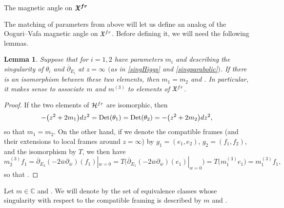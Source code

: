 \documentclass[11pt]{article}
\numberwithin{equation}{section}
\newtheorem{Lemma}[Theorem]{Lemma}
\numberwithin{equation}{section}
\begin{document}
\begin{subsubsection}{The magnetic angle on $\boldsymbol{\mathfrak{X}^{{\rm fr}}}$}

The matching of parameters from above will let us define an analog of the Ooguri--Vafa magnetic angle on $\mathfrak{X}^{{\rm fr}}$. Before defining it, we will need the following lemmas.

\begin{Lemma}\label{mm3inv} Suppose that  for $i=1,2$ have parameters $m_i$ and  describing the singularity of $\theta_i$ and $\overline{\partial}_{E_i}$ at $z=\infty$ $($as in \eqref{singHiggs} and \eqref{singparabolic}$)$. If there is an isomorphism between these two elements, then $m_1=m_2$ and . In particular, it makes sense to associate $m$ and $m^{(3)}$ to elements of $\mathfrak{X}^{\textnormal{fr}}$.

\end{Lemma}

\begin{proof} If the two elements of $\mathcal{H}^{{\rm fr}}$ are isomorphic, then
\begin{equation*}
-\bigl(z^2+2m_1\bigr){\rm d}z^2=\operatorname{Det}(\theta_1)=\operatorname{Det}(\theta_2)=-\bigl(z^2+2m_2\bigr){\rm d}z^2,
\end{equation*}
so that $m_1=m_2$. On the other hand, if we denote the compatible frames (and their extensions to local frames around $z=\infty$) by $g_1=(e_1,e_2)$, $g_2=(f_1,f_2)$, and the isomorphism by $T$, we then have
\begin{equation*}
 m^{(3)}_2f_1=\overline{\partial}_{E_2}(-2\overline{w}\partial_{\overline{w}})(f_1)|_{w=0}=T\bigl(\overline{\partial}_{E_1}(-2\overline{w}\partial_{\overline{w}})(e_1)|_{w=0}\bigr)
 =T\bigl(m^{(3)}_1e_1\bigr)=m^{(3)}_1f_1,
\end{equation*}
so that .
\end{proof}

\begin{Definition}\label{definition4.1} Let $m\in \mathbb{C}$ and \smash{$m^{(3)}\in \bigl(-\frac12,\frac12\bigr]$}. We will denote by  the set of equivalence classes whose singularity with respect to the compatible framing is described by $m$ and .
\end{Definition}


\end{subsubsection}
\end{document}
